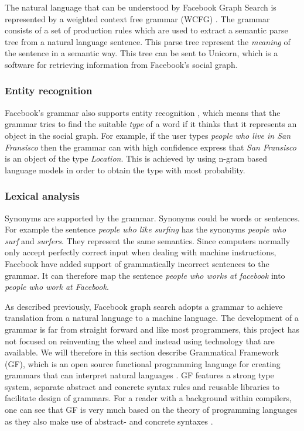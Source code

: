 The natural language that can be understood by Facebook Graph Search is represented by a weighted context free grammar (WCFG) \cite{li:2013}. The grammar consists of a set of production rules which are used to extract a semantic parse tree from a natural language sentence. This parse tree represent the \emph{meaning} of the sentence in a semantic way. This tree can be sent to Unicorn, which is a software for retrieving information from Facebook's social graph. \cite{citation-needed}

\subsubsection{Entity recognition}
Facebook's grammar also supports entity recognition \cite{citation-needed}, which means that the grammar tries to find the suitable \emph{type} of a word if it thinks that it represents an object in the social graph. For example, if the user types \emph{people who live in San Fransisco} then the grammar can with high confidence express that \emph{San Fransisco} is an object of the type \emph{Location}. This is achieved by using n-gram based language models in order to obtain the type with most probability.

\subsubsection{Lexical analysis}
Synonyms are supported by the grammar. Synonyms could be words or sentences. For example the sentence \emph{people who like surfing} has the synonyms \emph{people who surf} and \emph{surfers}. They represent the same semantics.
\newline
\newline
Since computers normally only accept perfectly correct input when dealing with machine instructions, Facebook have added support of grammatically incorrect sentences to the grammar. It can therefore map the sentence \emph{people who works at facebook} into \emph{people who work at Facebook}.

As described previously, Facebook graph search adopts a grammar to achieve translation from a natural language to a machine language. The development of a grammar is far from straight forward and like most programmers, this project has not focused on reinventing the wheel and instead using technology that are available. We will therefore in this section describe Grammatical Framework (GF), which is an open source functional programming language for creating grammars that can interpret natural languages \cite[p. 1]{ranta:2011}. GF features a strong type system, separate abstract and concrete syntax rules and reusable libraries to facilitate design of grammars. For a reader with a background within compilers, one can see that GF is very much based on the theory of programming languages as they also make use of abstract- and concrete syntaxes \cite[pp. 69-70]{Aho:1986:CPT:6448}.

